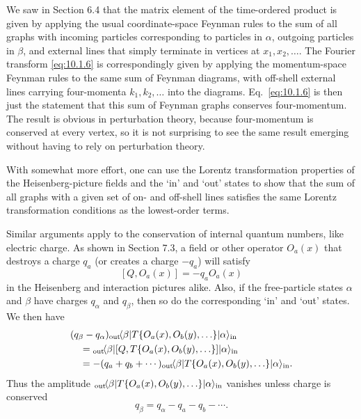 We saw in Section 6.4 that the matrix element of the time-ordered product
is given by applying the usual coordinate-space Feynman rules to the sum
of all graphs with incoming particles corresponding to particles in $\alpha$,
outgoing particles in $\beta$, and external lines that simply terminate in vertices
at $x_1,x_2,\ldots$. The Fourier transform \eqref{eq:10.1.6} is correspondingly given
by applying the momentum-space Feynman rules to the same sum of
Feynman diagrams, with off-shell external lines carrying four-momenta
$k_1,k_2,\ldots$ into the diagrams. Eq.~\eqref{eq:10.1.6} is then just the statement that
this sum of Feynman graphs conserves four-momentum. The result is
obvious in perturbation theory, because four-momentum is conserved at
every vertex, so it is not surprising to see the same result emerging without
having to rely on perturbation theory.

With somewhat more effort, one can use the Lorentz transformation
properties of the Heisenberg-picture fields and the `in' and `out' states to
show that the sum of all graphs with a given set of on- and off-shell lines
satisfies the same Lorentz transformation conditions as the lowest-order
terms.

Similar arguments apply to the conservation of internal quantum numbers,
like electric charge. As shown in Section 7.3, a field or other operator
$O_a(x)$ that destroys a charge $q_a$ (or creates a charge $-q_a$) will satisfy
\[
  [Q,O_a(x)]=-q_aO_a(x)
\]
in the Heisenberg and interaction pictures alike. Also, if the free-particle
states $\alpha$ and $\beta$ have charges $q_\alpha$ and $q_\beta$, then so do the corresponding `in'
and `out' states. We then have
\begin{align*}
  &(q_\beta-q_\alpha)
  {}_{\mathrm{out}}\!\langle \beta\rvert
  T\{O_a(x),O_b(y),\ldots\}
  \lvert \alpha\rangle_{\mathrm{in}}
  \\
  &\quad={}_{\mathrm{out}}\!\langle \beta\rvert
  [Q,T\{O_a(x),O_b(y),\ldots\}]
  \lvert \alpha\rangle_{\mathrm{in}}
  \\
  &\quad=-(q_a+q_b+\cdots)
  {}_{\mathrm{out}}\!\langle \beta\rvert
  T\{O_a(x),O_b(y),\ldots\}
  \lvert \alpha\rangle_{\mathrm{in}}.
\end{align*}
Thus the amplitude
${}_{\mathrm{out}}\!\langle \beta\rvert T\{O_a(x),O_b(y),\ldots\}\lvert \alpha\rangle_{\mathrm{in}}$
vanishes unless charge is conserved
\begin{equation}
  q_\beta=q_\alpha-q_a-q_b-\cdots.
  \tag{10.1.7}\label{eq:10.1.7}
\end{equation}


